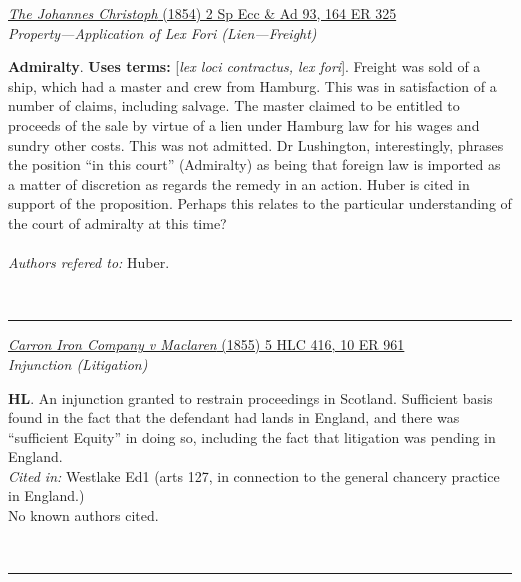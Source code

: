 \documentclass[twoside]{article}
\begin{document}
        \begin{small}
        \begin{center}
        \href{https://heinonline.org/HOL/P?h=hein.engrep/engri0164&i=329}{\textit{The Johannes Christoph} (1854) 2 Sp Ecc \& Ad 93, 164 ER 325} \label{104} \\ 
\textit{Property---Application of Lex Fori (Lien---Freight)}\\
        \end{center}
        \textbf{Admiralty}.  \textbf{Uses terms: }[\textit{lex loci contractus, lex fori}]. Freight was sold of a ship, which had a master and crew from Hamburg. This was in satisfaction of a number of claims, including salvage. The master claimed to be entitled to proceeds of the sale by virtue of a lien under Hamburg law for his wages and sundry other costs. This was not admitted. Dr Lushington, interestingly, phrases the position “in this court” (Admiralty) as being that foreign law is imported as a matter of discretion as regards the remedy in an action. Huber is cited in support of the proposition. Perhaps this relates to the particular understanding of the court of admiralty at this time?\\\\\textit{Authors refered to: }Huber.
        \end{small}\\
        \rule{\textwidth}{0.5pt}
        

        \begin{small}
        \begin{center}
        \href{https://heinonline.org/HOL/P?h=hein.engrep/engra0010&i=973}{\textit{Carron Iron Company v Maclaren} (1855) 5 HLC 416, 10 ER 961} \label{109} \\ 
\textit{Injunction (Litigation)}\\
        \end{center}
        \textbf{HL}. An injunction granted to restrain proceedings in Scotland. Sufficient basis found in the fact that the defendant had lands in England, and there was “sufficient Equity” in doing so, including the fact that litigation was pending in England.\\\textit{Cited in: }Westlake Ed1 (arts 127, in connection to the general chancery practice in England.)\\No known authors cited.
        \end{small}\\
        \rule{\textwidth}{0.5pt}
        
\end{document}
